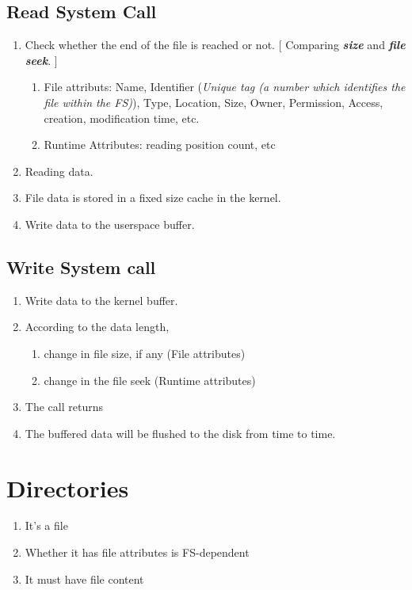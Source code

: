 \documentclass[]{report}
\renewcommand{\emph}[1]{\textbf{\textit{#1}}}
\begin{document}
		\subsection{Read System Call}
		\begin{enumerate}
			\item Check whether the end of the file is reached or not. [ Comparing \emph{size} and \emph{file seek}. ]
			\begin{enumerate}
				\item File attributs: Name, Identifier (\textit{Unique tag (a number which identifies the file within the FS)}), Type, Location, Size, Owner, Permission, Access, creation, modification time, etc.
				\item Runtime Attributes: reading position count, etc
			\end{enumerate}
			\item Reading data.
			\item File data is stored in a fixed size cache in the kernel.
			\item Write data to the userspace buffer.
		\end{enumerate}

		\subsection{Write System call}
		\begin{enumerate}
			\item Write data to the kernel buffer.
			\item According to the data length,
			\begin{enumerate}
				\item change in file size, if any (File attributes)
				\item change in the file seek (Runtime attributes)
			\end{enumerate}
			\item The call returns
			\item The buffered data will be flushed to the disk from time to time.
		\end{enumerate}
	\section{Directories}
		\begin{enumerate}
			\item It's a file
			\item Whether it has file attributes is FS-dependent
			\item It must have file content
		\end{enumerate}
\end{document}
